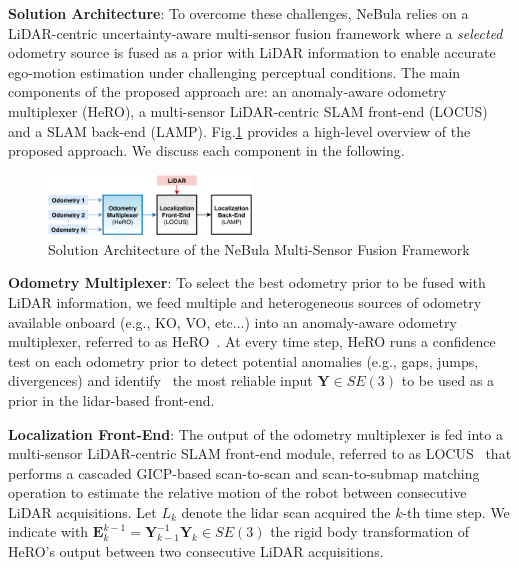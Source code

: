\documentclass[letterpaper, 10pt, conference]{ieeeconf}      %
\newcommand{\ph}[1]{{\textbf{#1}:}} %
\newcommand{\rev}[1]{{\color{blue} #1 }} %
\begin{document}
\ph{Solution Architecture} To overcome these challenges, NeBula relies on a LiDAR-centric uncertainty-aware multi-sensor fusion framework where a \emph{selected} odometry source is fused as a prior with LiDAR information to enable accurate ego-motion estimation under challenging perceptual conditions. The main components of the proposed approach are:  an anomaly-aware odometry multiplexer (HeRO),  a multi-sensor LiDAR-centric SLAM front-end (LOCUS) and  a SLAM back-end (LAMP). Fig.\ref{architecture} provides a high-level overview of the proposed approach. We discuss each component in the following.

\begin{figure}[thpb]
  \centering
  \includegraphics[width=0.48\textwidth]{spot_iros/graphics/architecture.pdf}
  \caption{\rev{Solution Architecture of the NeBula Multi-Sensor Fusion Framework}}
  \label{architecture}
\end{figure}



\ph{Odometry Multiplexer} To select the best odometry prior to be fused with LiDAR information, we feed multiple and heterogeneous sources of odometry available onboard (e.g., KO, VO, etc...) into an anomaly-aware odometry multiplexer, referred to as HeRO~\cite{Santamaria-navarro2019}. At every time step, HeRO runs a confidence test on each odometry prior to detect potential anomalies %
(e.g., gaps, jumps, divergences) and identify~\cite{Santamaria-navarro2019} the most reliable input $\textbf{Y} \in SE(3)$ to be used as a prior in the lidar-based front-end.



\ph{Localization Front-End} The output of the odometry multiplexer is fed into a multi-sensor LiDAR-centric SLAM front-end module, referred to as LOCUS~\cite{Palieri2020} that performs a cascaded GICP-based scan-to-scan and scan-to-submap matching operation to estimate the relative motion of the robot between consecutive LiDAR acquisitions. Let $L_{k}$ denote the lidar scan acquired the $k$-th time step. We indicate with $\textbf{E}^{k-1}_{k} = \textbf{Y}^{-1}_{k-1}\textbf{Y}_k\in SE(3)$ the rigid body transformation of HeRO's output between two consecutive LiDAR acquisitions. %
\end{document}
